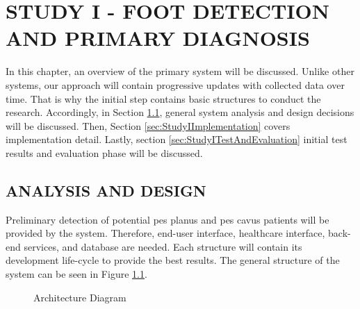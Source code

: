 \chapter{STUDY I - FOOT DETECTION AND PRIMARY DIAGNOSIS}\label{chp:Foot Detection & Primary Diagnosis}

In this chapter, an overview of the primary system will be discussed. Unlike other systems, our approach will contain progressive updates with collected data over time. That is why the initial step contains basic structures to conduct the research. Accordingly, in Section \ref{sec:StudyIAnalysisAndDesign}, general system analysis and design decisions will be discussed. Then, Section \ref{sec:StudyIImplementation} covers implementation detail. Lastly, section \ref{sec:StudyITestAndEvaluation} initial test results and evaluation phase will be discussed.

\section{ANALYSIS AND DESIGN}\label{sec:StudyIAnalysisAndDesign}

Preliminary detection of potential pes planus and pes cavus patients will be provided by the system. Therefore, end-user interface, healthcare interface, back-end services, and database are needed. Each structure will contain its development life-cycle to provide the best results. The general structure of the system can be seen in Figure \ref{fig:GeneralArchitectureDiagram}.

\begin{figure}[htbp]
\centering
{}
\caption{Architecture Diagram}
\label{fig:GeneralArchitectureDiagram}
\end{figure}

